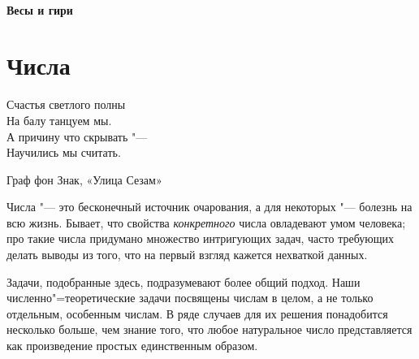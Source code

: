 \documentclass[twoside]{book}
\begin{document}


\subsubsection*{Весы и гири} %








\chapter{Числа}

\setlength{\epigraphwidth}{.4\textwidth}
\epigraph{Счастья светлого полны\\ %
На балу танцуем мы.\\ %
А причину что скрывать "---\\ %
Научились мы считать.\vspace{1ex}}{Граф фон Знак, «Улица Сезам»}


 

Числа "--- это бесконечный источник очарования, а для некоторых "--- болезнь на всю жизнь. %
Бывает, что свойства \emph{конкретного} числа овладевают умом человека;
про такие числа придумано множество интригующих задач,
часто требующих делать выводы из того, что на первый взгляд кажется нехваткой данных.

Задачи, подобранные здесь, подразумевают %
более общий подход. %
Наши численно"=теоретические задачи посвящены числам в целом, а не только отдельным, особенным числам.
В ряде случаев для их решения понадобится несколько больше, чем знание того, 
что любое натуральное число представляется как произведение простых единственным образом.
\end{document}
